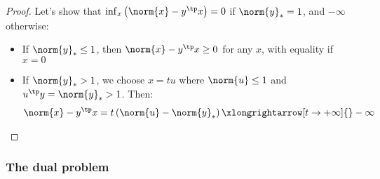 \begin{proof}
    Let's show that $\inf_x\left(\norm{x}-y^\tp x\right)=0$ if $\norm{y}_*=1$, and $-\infty$ otherwise:
    \begin{itemize}
        \item If $\norm{y}_*\leq1$, then $\norm{x}-y^\tp x\geq 0$ for any $x$, with equality if $x=0$
        \item If $\norm{y}_*>1$, we choose $x=tu$ where $\norm{u}\leq1$ and $u^\tp y=\norm{y}_*>1$. Then:
        \begin{equation*}
            \norm{x} - y^\tp x = t\left(\norm{u}-\norm{y}_*\right) \xlongrightarrow[t\to+\infty]{}-\infty
        \end{equation*}
    \end{itemize}
\end{proof}

\subsubsection{The dual problem}
